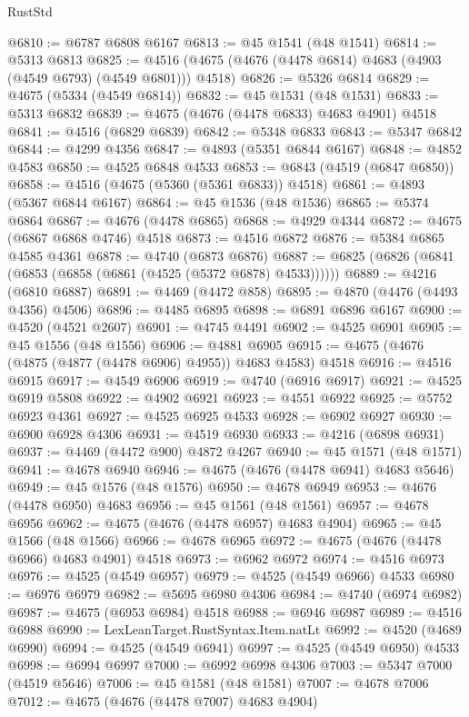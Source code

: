 \begin{lexlean}{RustStd}
\begin{coremodule}
{\begin{coremodule}
{{{{{{{{{{{{{{{{{{{{{{{{{{{{{{{{{{{{{{{{{{{{{{{{{{{{{{{{{{{{@6810 := @6787 @6808 @6167
@6813 := @45 @1541 (@48 @1541)
@6814 := @5313 @6813
@6825 := @4516 (@4675 (@4676 (@4478 @6814) @4683 (@4903 (@4549 @6793) (@4549 @6801))) @4518)
@6826 := @5326 @6814
@6829 := @4675 (@5334 (@4549 @6814))
@6832 := @45 @1531 (@48 @1531)
@6833 := @5313 @6832
@6839 := @4675 (@4676 (@4478 @6833) @4683 @4901) @4518
@6841 := @4516 (@6829 @6839)
@6842 := @5348 @6833
@6843 := @5347 @6842
@6844 := @4299 @4356
@6847 := @4893 (@5351 @6844 @6167)
@6848 := @4852 @4583
@6850 := @4525 @6848 @4533
@6853 := @6843 (@4519 (@6847 @6850))
@6858 := @4516 (@4675 (@5360 (@5361 @6833)) @4518)
@6861 := @4893 (@5367 @6844 @6167)
@6864 := @45 @1536 (@48 @1536)
@6865 := @5374 @6864
@6867 := @4676 (@4478 @6865)
@6868 := @4929 @4344
@6872 := @4675 (@6867 @6868 @4746) @4518
@6873 := @4516 @6872
@6876 := @5384 @6865 @4585 @4361
@6878 := @4740 (@6873 @6876)
@6887 := @6825 (@6826 (@6841 (@6853 (@6858 (@6861 (@4525 (@5372 @6878) @4533))))))
@6889 := @4216 (@6810 @6887)
@6891 := @4469 (@4472 @858)
@6895 := @4870 (@4476 (@4493 @4356) @4506)
@6896 := @4485 @6895
@6898 := @6891 @6896 @6167
@6900 := @4520 (@4521 @2607)
@6901 := @4745 @4491
@6902 := @4525 @6901
@6905 := @45 @1556 (@48 @1556)
@6906 := @4881 @6905
@6915 := @4675 (@4676 (@4875 (@4877 (@4478 @6906) @4955)) @4683 @4583) @4518
@6916 := @4516 @6915
@6917 := @4549 @6906
@6919 := @4740 (@6916 @6917)
@6921 := @4525 @6919 @5808
@6922 := @4902 @6921
@6923 := @4551 @6922
@6925 := @5752 @6923 @4361
@6927 := @4525 @6925 @4533
@6928 := @6902 @6927
@6930 := @6900 @6928 @4306
@6931 := @4519 @6930
@6933 := @4216 (@6898 @6931)
@6937 := @4469 (@4472 @900) @4872 @4267
@6940 := @45 @1571 (@48 @1571)
@6941 := @4678 @6940
@6946 := @4675 (@4676 (@4478 @6941) @4683 @5646)
@6949 := @45 @1576 (@48 @1576)
@6950 := @4678 @6949
@6953 := @4676 (@4478 @6950) @4683
@6956 := @45 @1561 (@48 @1561)
@6957 := @4678 @6956
@6962 := @4675 (@4676 (@4478 @6957) @4683 @4904)
@6965 := @45 @1566 (@48 @1566)
@6966 := @4678 @6965
@6972 := @4675 (@4676 (@4478 @6966) @4683 @4901) @4518
@6973 := @6962 @6972
@6974 := @4516 @6973
@6976 := @4525 (@4549 @6957)
@6979 := @4525 (@4549 @6966) @4533
@6980 := @6976 @6979
@6982 := @5695 @6980 @4306
@6984 := @4740 (@6974 @6982)
@6987 := @4675 (@6953 @6984) @4518
@6988 := @6946 @6987
@6989 := @4516 @6988
@6990 := LexLeanTarget.RustSyntax.Item.natLt
@6992 := @4520 (@4689 @6990)
@6994 := @4525 (@4549 @6941)
@6997 := @4525 (@4549 @6950) @4533
@6998 := @6994 @6997
@7000 := @6992 @6998 @4306
@7003 := @5347 @7000 (@4519 @5646)
@7006 := @45 @1581 (@48 @1581)
@7007 := @4678 @7006
@7012 := @4675 (@4676 (@4478 @7007) @4683 @4904)
}}}}}}}}}}}}}}}}}}}}}}}}}}}}}}}}}}}}}}}}}}}}}}}}}}}}}}}}}}}}
\end{coremodule}}
\end{coremodule}
\end{lexlean}

